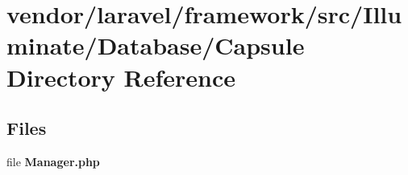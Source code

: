 \section{vendor/laravel/framework/src/\+Illuminate/\+Database/\+Capsule Directory Reference}
\label{dir_95d8e1aa9487e777c884fc015a620958}
\subsection*{Files}
\begin{DoxyCompactItemize}
\item 
file {\bf Manager.\+php}
\end{DoxyCompactItemize}
